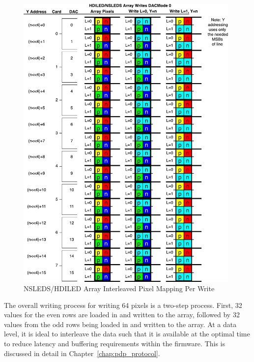     \begin{figure}
        \centering
        \includegraphics[width=0.98\textwidth]{fig/nsleds_hdiled_array_writing.pdf}
        \caption{NSLEDS/HDILED Array Interleaved Pixel Mapping Per Write}
        \label{fig:nsleds_hdiled_array_interleaved_pixel_mapping_per_write}
    \end{figure}

    The overall writing process for writing 64 pixels is a two-step process. First, 32 values for the even rows are loaded in and written to the array, followed by 32 values from the odd rows being loaded in and written to the array. At a data level, it is ideal to interleave the data such that it is available at the optimal time to reduce latency and buffering requirements within the firmware. This is discussed in detail in Chapter~\ref{chap:pdp_protocol}.

